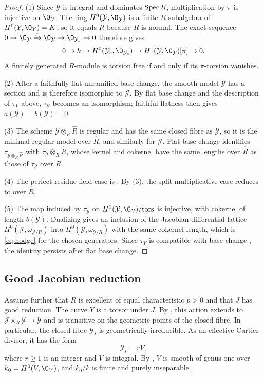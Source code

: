 \begin{proof}
(1) Since $\mathcal Y$ is integral and dominates $\operatorname{Spec} R$, multiplication by $\pi$ is injective on $\O_{\mathcal Y}$.
The ring $H^0(\mathcal Y,\O_{\mathcal Y})$ is a finite $R$-subalgebra of $H^0(Y,\O_Y) = K$, so it equals $R$ because $R$ is normal.
The exact sequence $0\to\O_{\mathcal Y}\xrightarrow{\pi}\O_{\mathcal Y}\to\O_{\mathcal Y_s}\to 0$ therefore gives
\[
  0\to k\to H^0(\mathcal Y_s,\O_{\mathcal Y_s})\to H^1(\mathcal Y,\O_{\mathcal Y})[\pi]\to 0.
\]
A finitely generated $R$-module is torsion free if and only if its $\pi$-torsion vanishes.

(2) After a faithfully flat unramified base change, the smooth model $\mathcal Y$ has a section and is therefore isomorphic to $\mathcal J$.
By flat base change and the description of $\tau_Y$ above, $\tau_{\mathcal Y}$ becomes an isomorphism; faithful flatness then gives $a(\mathcal Y) = b(\mathcal Y) = 0$.

(3) The scheme $\mathcal Y\otimes_R\widehat R$ is regular \cite[Tag~]{Stacks} and has the same closed fibre as $\mathcal Y$, so it is the minimal regular model over $\widehat R$, and similarly for $\mathcal J$.
Flat base change identifies $\tau_{\mathcal Y\otimes_R\widehat R}$ with $\tau_{\mathcal Y}\otimes_R\widehat R$, whose kernel and cokernel have the same lengths over $\widehat R$ as those of $\tau_{\mathcal Y}$ over $R$.

(4) The perfect-residue-field case is \cite[Theorem~3.8]{LLR04}.
By (3), the split multiplicative case reduces to \cite[Remark~8.13]{LLR04} over $\widehat R$.

(5) The map induced by $\tau_{\mathcal Y}$ on $H^1(\mathcal Y,\O_{\mathcal Y})/{\rm tors}$ is injective, with cokernel of length $b(\mathcal Y)$.
Dualizing gives an inclusion of the Jacobian differential lattice $H^0(\mathcal J,\omega_{\mathcal J/R})$ into $H^0(\mathcal Y,\omega_{\mathcal Y/R})$ with the same cokernel length, which is \eqref{eq:hodge} for the chosen generators.
Since $\tau_Y$ is compatible with base change \cite[1.4]{LLR04}, the identity persists after flat base change.
\end{proof}

\subsection{Good Jacobian reduction}\label{subsec:good-jacobian-reduction}
Assume further that $R$ is excellent of equal characteristic $p>0$ and that $J$ has good reduction.
The curve $Y$ is a torsor under $J$.
By \cite[Proposition~8.1 and Remark~8.2]{LLR04}, this action extends to $\mathcal J\times_R\mathcal Y\to\mathcal Y$ and is transitive on the geometric points of the closed fibre.
In particular, the closed fibre $\mathcal Y_s$ is geometrically irreducible.
As an effective Cartier divisor, it has the form
\[
  \mathcal Y_s=rV,
\]
where $r\geq1$ is an integer and $V$ is integral.
By \cite[Proposition~8.1]{LLR04}, $V$ is smooth of genus one over $k_0=H^0(V,\O_V)$, and $k_0/k$ is finite and purely inseparable.

